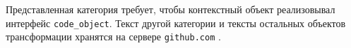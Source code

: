 \documentclass[conference]{IEEEtran} \IEEEoverridecommandlockouts
\begin{document}
Представленная категория требует, чтобы контекстный объект реализовывал интерфейс \texttt{code\_object}. Текст другой категории и тексты остальных объектов трансформации хранятся на сервере \texttt{github.com} \cite{ghsrc}. 

\end{document}
